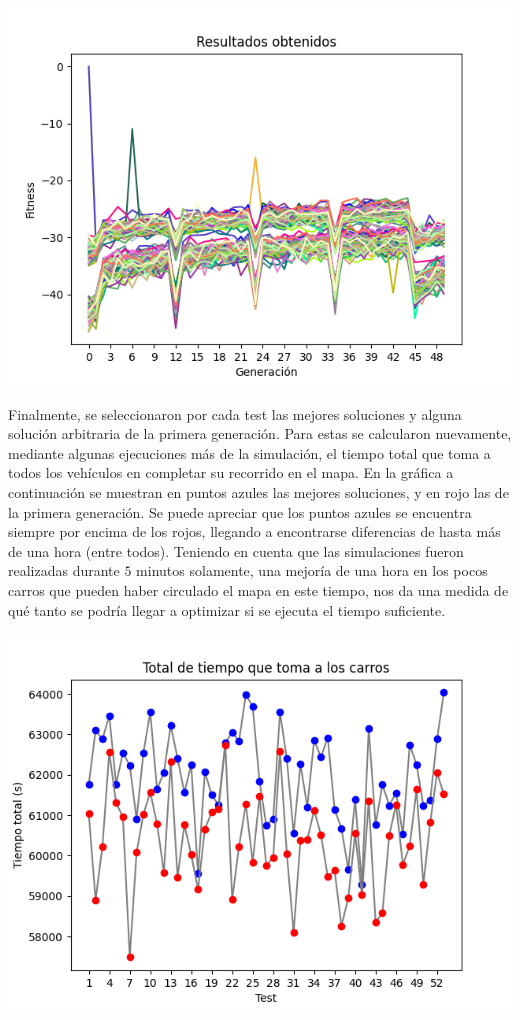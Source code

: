 \documentclass[colorinlistoftodos,twoside,twocolumn]{article} %
\begin{document}
	\begin{center}
		\includegraphics[width=\columnwidth]{all_graphics.png}
	\end{center}

	Finalmente, se seleccionaron por cada test las mejores soluciones y alguna soluci\'on arbitraria de la primera generaci\'on. Para estas se calcularon nuevamente, mediante algunas ejecuciones m\'as de la simulaci\'on, el tiempo total que toma a todos los veh\'iculos en completar su recorrido en el mapa. En la gr\'afica a continuaci\'on se muestran en puntos azules las mejores soluciones, y en rojo las de la primera generaci\'on. Se puede apreciar que los puntos azules se encuentra siempre por encima de los rojos, llegando a encontrarse diferencias de hasta m\'as de una hora (entre todos). Teniendo en cuenta que las simulaciones fueron realizadas durante $5$ minutos solamente, una mejor\'ia de una hora en los pocos carros que pueden haber circulado el mapa en este tiempo, nos da una medida de qu\'e tanto se podr\'ia llegar a optimizar si se ejecuta el tiempo suficiente.
	
	\begin{center}
		\includegraphics[width=\columnwidth]{graphic_total_time_take_cars.png}
	\end{center}
\end{document}
